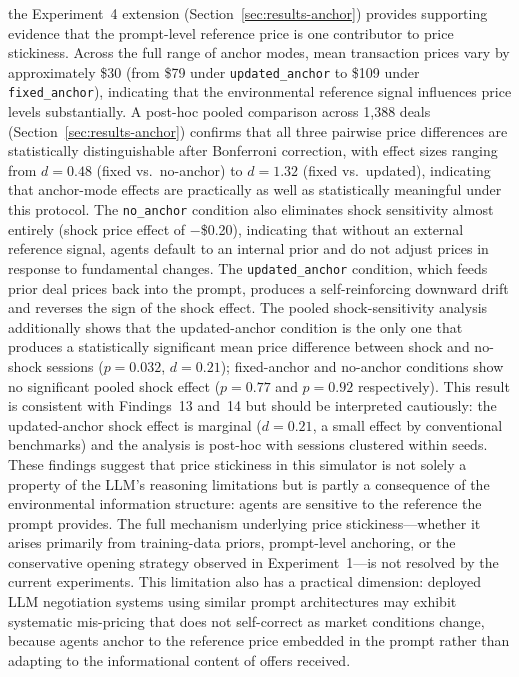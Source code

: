 the Experiment~4 extension (Section~\ref{sec:results-anchor}) provides supporting evidence that the prompt-level reference price is one contributor to price stickiness.  Across the full range of anchor modes, mean transaction prices vary by approximately \$30 (from \$79 under \texttt{updated\_anchor} to \$109 under \texttt{fixed\_anchor}), indicating that the environmental reference signal influences price levels substantially.  A post-hoc pooled comparison across 1{,}388 deals (Section~\ref{sec:results-anchor}) confirms that all three pairwise price differences are statistically distinguishable after Bonferroni correction, with effect sizes ranging from $d = 0.48$ (fixed vs.\ no-anchor) to $d = 1.32$ (fixed vs.\ updated), indicating that anchor-mode effects are practically as well as statistically meaningful under this protocol.  The \texttt{no\_anchor} condition also eliminates shock sensitivity almost entirely (shock price effect of $-$\$0.20), indicating that without an external reference signal, agents default to an internal prior and do not adjust prices in response to fundamental changes.  The \texttt{updated\_anchor} condition, which feeds prior deal prices back into the prompt, produces a self-reinforcing downward drift and reverses the sign of the shock effect.  The pooled shock-sensitivity analysis additionally shows that the updated-anchor condition is the only one that produces a statistically significant mean price difference between shock and no-shock sessions ($p = 0.032$, $d = 0.21$); fixed-anchor and no-anchor conditions show no significant pooled shock effect ($p = 0.77$ and $p = 0.92$ respectively).  This result is consistent with Findings~13 and~14 but should be interpreted cautiously: the updated-anchor shock effect is marginal ($d = 0.21$, a small effect by conventional benchmarks) and the analysis is post-hoc with sessions clustered within seeds.  These findings suggest that price stickiness in this simulator is not solely a property of the LLM's reasoning limitations but is partly a consequence of the environmental information structure: agents are sensitive to the reference the prompt provides.  The full mechanism underlying price stickiness---whether it arises primarily from training-data priors, prompt-level anchoring, or the conservative opening strategy observed in Experiment~1---is not resolved by the current experiments.  This limitation also has a practical dimension: deployed LLM negotiation systems using similar prompt architectures may exhibit systematic mis-pricing that does not self-correct as market conditions change, because agents anchor to the reference price embedded in the prompt rather than adapting to the informational content of offers received.

